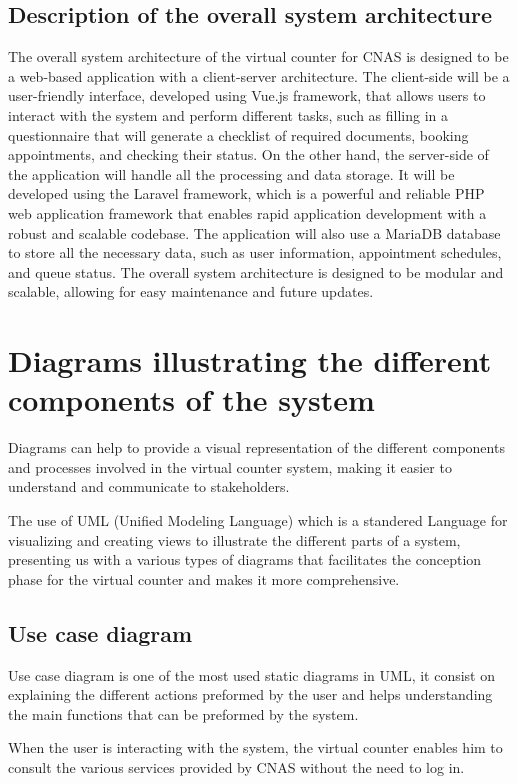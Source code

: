 \subsection{Description of the overall system architecture}
The overall system architecture of the virtual counter for CNAS is designed to be a web-based application with a client-server architecture. The client-side will be a user-friendly interface, developed using Vue.js framework, that allows users to interact with the system and perform different tasks, such as filling in a questionnaire that will generate a checklist of required documents, booking appointments, and checking their status. On the other hand, the server-side of the application will handle all the processing and data storage. It will be developed using the Laravel framework, which is a powerful and reliable PHP web application framework that enables rapid application development with a robust and scalable codebase. The application will also use a MariaDB database to store all the necessary data, such as user information, appointment schedules, and queue status. The overall system architecture is designed to be modular and scalable, allowing for easy maintenance and future updates.

\section{Diagrams illustrating the different components of the system}
Diagrams can help to provide a visual representation of the different components and processes involved in the virtual counter system, making it easier to understand and communicate to stakeholders.

\medskip The use of UML (Unified Modeling Language) which is a standered Language for visualizing and creating views to illustrate the different parts of a system, presenting us with a various types of diagrams that facilitates the conception phase for the virtual counter and makes it more comprehensive.  

\subsection{Use case diagram}
Use case diagram is one of the most used static diagrams in UML, it consist on explaining the different actions preformed by the user and helps understanding the main functions that can be preformed by the system.  

When the user is interacting with the system, the virtual counter enables him to consult the various services provided  by CNAS without the need to log in. 
 
